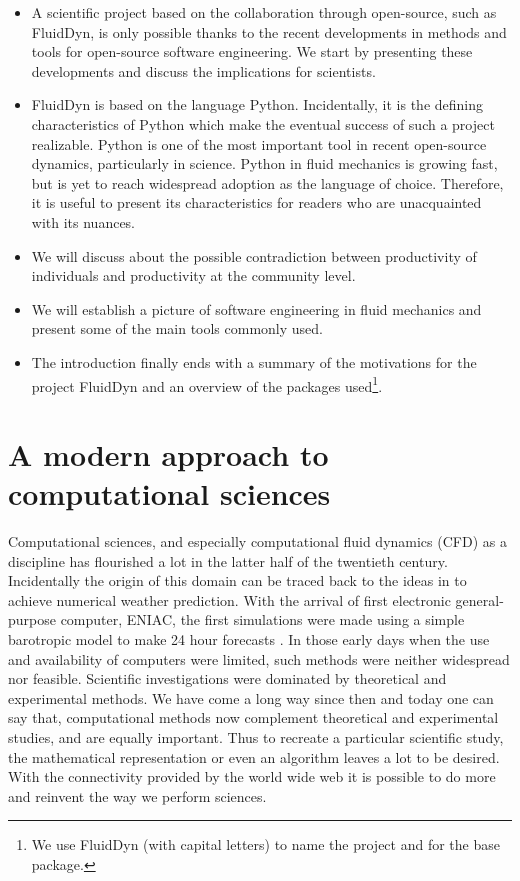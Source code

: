 \begin{itemize}
\item A scientific project based on the collaboration through open-source, such
as FluidDyn, is only possible thanks to the recent developments in methods and
tools for open-source software engineering. We start by presenting these
developments and discuss the implications for scientists.

\item FluidDyn is based on the language Python. Incidentally, it is the defining
characteristics of Python which make the eventual success of such a
project realizable.
%
Python is one of the most important tool in recent open-source dynamics,
particularly in science.
%
Python in fluid mechanics is growing fast, but is yet to reach widespread
adoption as the language of choice. Therefore, it is useful to present its
characteristics for readers who are unacquainted with its nuances.

\item We will discuss about the possible contradiction between productivity of
individuals and productivity at the community level.

\item We will establish a picture of software engineering in fluid mechanics
and present some of the main tools commonly used.

\item The introduction finally ends with a summary of the motivations for the
project FluidDyn and an overview of the packages used\footnote{%
  We use FluidDyn (with capital letters) to name the project and \fluiddyn for
the base package.}.
\end{itemize}


\section{A modern approach to computational sciences}

Computational sciences, and especially computational fluid dynamics (CFD) as a
discipline has flourished a lot in the latter half of the twentieth century.
Incidentally the origin of this domain can be traced back to the ideas
in \citet{richardson_weather_1922} to achieve numerical weather prediction.
With the arrival of first electronic general-purpose computer, ENIAC, the first
simulations were made using a simple barotropic model to make 24 hour
forecasts \citep{lynch_richardson_2010}. In those early days when the use and
availability of computers were limited, such methods were neither widespread
nor feasible. Scientific investigations were dominated by theoretical and
experimental methods.
We have come a long way since then and today one can say that, computational
methods now complement theoretical and experimental studies, and are equally
important.
Thus to recreate a particular scientific study, the mathematical representation
or even an algorithm leaves a lot to be desired. With the connectivity
provided by the world wide web it is possible to do more and reinvent the way
we perform sciences.

